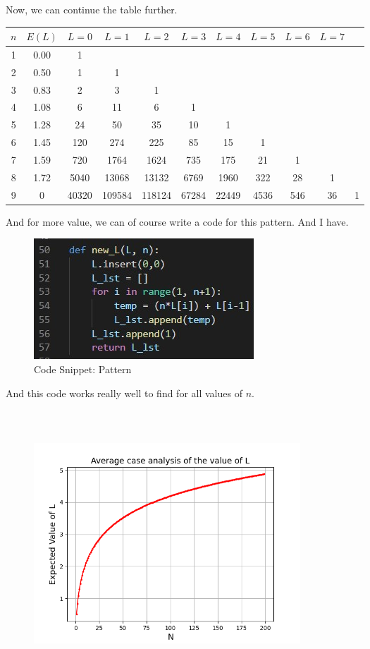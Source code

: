 \documentclass[a4paper]{exam}
\begin{document}
\begin{questions}
\begin{mdframed}
   Now, we can continue the table further.
   \begin{table}[H]
       \centering
       \begin{tabular}{c|c|c|c|c|c|c|c|c|c|c}
          $n$ & $E(L) $  & $L = 0$ & $L = 1$ & $L = 2$ & $L = 3$ & $L = 4$ & $L = 5$ & $L = 6$ & $L = 7$ & \\ \hline
           1 & 0.00 & 1 & & & & & & &\\ 
           2 & 0.50 & 1 & 1 & & & & & &\\
           3 & 0.83 & 2 & 3 & 1 & & & & &\\ 
           4 & 1.08 & 6 & 11 & 6 & 1 & & & &\\
           5 & 1.28 & 24 & 50 & 35 & 10 & 1 & & &\\
           6 & 1.45 & 120 & 274 & 225 & 85 & 15 & 1 & & &\\
           7 & 1.59 & 720 & 1764 & 1624 & 735 & 175 & 21 & 1 &&  \\
           8 & 1.72 & 5040 & 13068 & 13132 & 6769 & 1960 & 322 & 28 & 1 &\\
           9 & 0 & 40320 & 109584 & 118124 & 67284 & 22449 & 4536 & 546 & 36 & 1 \\
       \end{tabular}
   \end{table}
   And for more value, we can of course write a code for this pattern. And I have. 
   \begin{figure}[H]
       \centering
       \includegraphics{new_L.jpg}
       \caption{Code Snippet: Pattern}
       \label{fig:my_label}
   \end{figure}
   And this code works really well to find for all values of $n$. 
   \begin{figure}[H]
       \centering
       \includegraphics[width=10cm, height=10cm]{figure.png}

\end{figure}
\end{mdframed}
\end{questions}
\end{document}
